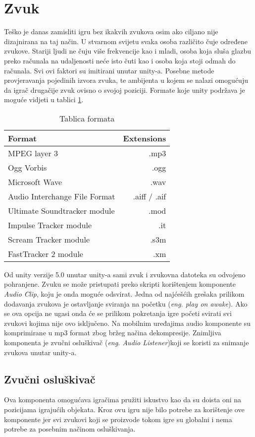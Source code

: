 \section{Zvuk}
Teško je danas zamisliti igru bez ikakvih zvukova osim ako ciljano nije dizajnirana na taj način. U stvarnom svijetu svaka osoba različito čuje određene zvukove. Stariji ljudi ne čuju više frekvencije kao i mladi, osoba koja sluša glazbu preko računala na udaljenosti neće isto čuti kao i osoba koja stoji odmah do računala. Svi ovi faktori su imitirani unutar unity-a. Posebne metode provjeravanja pojedinih izvora zvuka, te ambijenta u kojem se nalazi omogućuju da igrač drugačije zvuk ovisno o svojoj poziciji. Formate koje unity podržava je moguće vidjeti u tablici \ref{table:tablicaFormata}.

\begin{table}[h]
\large
\begin{tabular}{ l | r } \hline	
	Format & Extensions \\
	\hline MPEG layer 3 & .mp3 \\
	\hline Ogg Vorbis  & .ogg \\
	\hline Microsoft Wave  & .wav \\
	\hline Audio Interchange File Format & .aiff / .aif \\
	\hline Ultimate Soundtracker module  & .mod \\
	\hline Impulse Tracker module  & .it \\
	\hline Scream Tracker module & .s3m \\
	\hline FastTracker 2 module  & .xm \\
\end{tabular}
	\label{table:tablicaFormata}
	\caption{Tablica formata}
\end{table}

Od unity verzije 5.0 unutar unity-a sami zvuk i zvukovna datoteka su odvojeno pohranjene. Zvuku se može pristupati preko skripti korištenjem komponente \emph{Audio Clip}, koju je onda moguće odsvirat. Jedna od najćešćih grešaka prilikom dodavanja zvukova je ostavljanje sviranja na početku (\emph{eng. play on awake}). Ako se ova opcija ne ugasi onda će se prilikom pokretanja igre početi svirati svi zvukovi kojima nije ovo isključeno. Na mobilnim uređajima audio komponente su komprimirane u mp3 format zbog bržeg načina dekompresije. Znimljiva komponenta je zvučni osluškivač (\emph{eng. Audio Listener})koji se koristi za snimanje zvukova unutar unity-a.
\newpage
\subsection{Zvučni osluškivač}
Ova komponenta omogućava igračima pružiti iskustvo kao da su doista oni na pozicijama igrajućih objekata. Kroz ovu igru nije bilo potrebe za korištenje ove komponente jer svi zvukovi koji se proizvode tokom igre su globalni i nema potrebe za posebnim načinom osluškivanja.